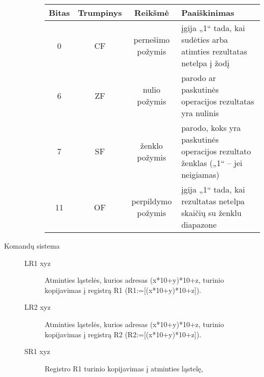 \begin{description}
\begin{description}
        
        \begin{tabularx}{0.85\textwidth}{|c|c|c|X|}
        \hline
           Bitas & Trumpinys & Reikšmė & Paaiškinimas %
           \\
           \hline
           0 & CF & pernešimo požymis & įgija „1“ tada, kai sudėties arba
           atimties rezultatas netelpa į žodį 
           \\
           \hline
          6 & ZF & nulio požymis & parodo ar paskutinės operacijos 
          rezultatas yra nulinis %
          \\
          \hline
          7 & SF & ženklo požymis & parodo, koks yra paskutinės operacijos 
          rezultato ženklas („1“ – jei neigiamas) 
          \\
          \hline
          11 & OF & perpildymo požymis & įgija „1“ tada, kai rezultatas
          netelpa skaičių su ženklu diapazone 
          \\
          \hline
        \end{tabularx}
    \end{description}
  \item[Komandų sistema] 
    \begin{description}
        \item[LR1 xyz] Atminties ląstelės, kurios adresas (x*10+y)*10+z,
          turinio kopijavimas į registrą R1 (R1:=[(x*10+y)*10+z]).
        \item[LR2 xyz] Atminties ląstelės, kurios adresas (x*10+y)*10+z, 
          turinio kopijavimas į registrą R2 (R2:=[(x*10+y)*10+z]).
        \item[SR1 xyz] Registro R1 turinio kopijavimas į atminties ląstelę, 

\end{description}
\end{description}
